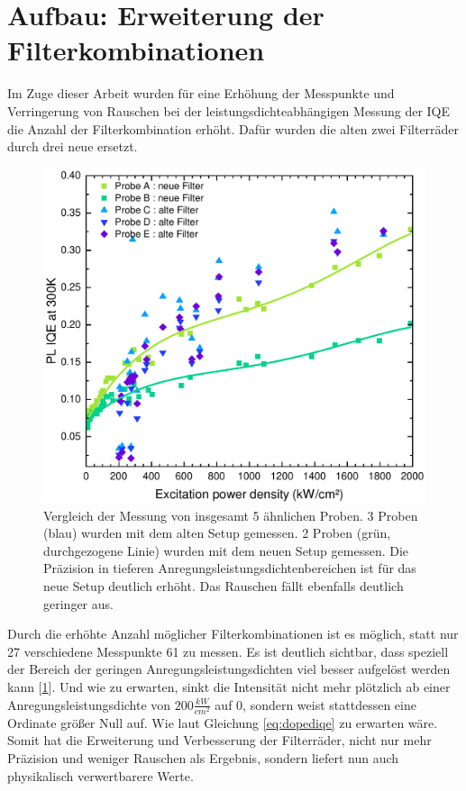 \section{Aufbau: Erweiterung der Filterkombinationen}
\thispagestyle{fancy}

Im Zuge dieser Arbeit wurden für eine Erhöhung der Messpunkte und Verringerung von Rauschen bei der leistungsdichteabhängigen Messung der IQE die Anzahl der Filterkombination erhöht. Dafür wurden die alten zwei Filterräder durch drei neue ersetzt. 
%
\begin{figure}[ht!]
    \centering
    \begin{minipage}[t]{1\linewidth}
        \centering
        \includegraphics[width = 0.49\linewidth]{Bilder/AuswertungNovemeberKorr1VergleichFilter.pdf}
        \caption{Vergleich der Messung von insgesamt 5 ähnlichen Proben. 3 Proben (blau) wurden mit dem alten Setup gemessen. 2 Proben (grün, durchgezogene Linie) wurden mit dem neuen Setup gemessen. Die Präzision in tieferen Anregungsleistungsdichtenbereichen ist für das neue Setup deutlich erhöht. Das Rauschen fällt ebenfalls deutlich geringer aus. }
        \label{fig:vergleichFilter}
    \end{minipage}
\end{figure}
%
\newpage
Durch die erhöhte Anzahl möglicher Filterkombinationen ist es möglich, statt nur 27 verschiedene Messpunkte 61 zu messen. Es ist deutlich sichtbar, dass speziell der Bereich der geringen Anregungsleistungsdichten viel besser aufgelöst werden kann [\ref{fig:vergleichFilter}]. Und wie zu erwarten, sinkt die Intensität nicht mehr plötzlich ab einer Anregungsleistungsdichte von $200 \frac{kW}{cm^2}$ auf 0, sondern weist stattdessen eine Ordinate größer Null auf. Wie laut Gleichung \ref{eq:dopediqe} zu erwarten wäre. Somit hat die Erweiterung und Verbesserung der Filterräder, nicht nur mehr Präzision und weniger Rauschen als Ergebnis, sondern liefert nun auch physikalisch verwertbarere Werte.
%
